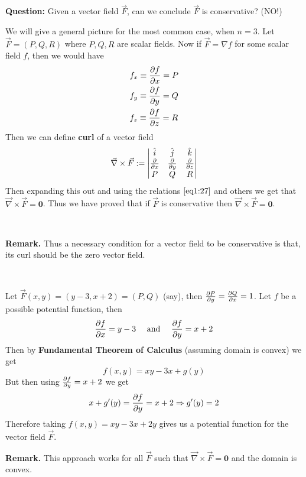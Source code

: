 \documentclass[../Analysis-3]{subfiles}
\begin{document}
\textbf{Question:} Given a vector field $\vec{F}$, can we conclude $\vec{F}$ is conservative? (NO!)

We will give a general picture for the most common case, when $n = 3$. Let $\vec{F} = (P,Q,R)$ where $P,Q,R$ are scalar fields. Now if $\vec{F} = \nabla f$ for some scalar field $f$, then we would have
\begin{align}\label{eq1:27}
     & f_x \equiv \pdv{f}{x} = P \\
     & f_y \equiv \pdv{f}{y} = Q \\
     & f_z \equiv \pdv{f}{z} = R
\end{align}
Then we can define \textbf{curl} of a vector field
\[
    \vec{\nabla} \times \vec{F} := \begin{vmatrix}
        \hat{i}   & \hat{j}   & \hat{k}   \\
        \pdv{}{x} & \pdv{}{y} & \pdv{}{z} \\
        P         & Q         & R
    \end{vmatrix}
\]
Then expanding this out and using the relations $\ref{eq1:27}$ and others we get that $\vec{\nabla} \times \vec{F} = \mathbf{0}$. Thus we have proved that if $\vec{F}$ is conservative then $\vec{\nabla} \times \vec{F} = \mathbf{0}$.

\

\textbf{Remark.} Thus a necessary condition for a vector field to be conservative is that, its curl should be the zero vector field.

\

\begin{Eg}{}{}
    Let $\vec{F}(x,y) = (y-3,x+2) = (P,Q)$ (say), then $\pdv{P}{y} = \pdv{Q}{x} = 1$. Let $f$ be a possible potential function, then
    \[
        \pdv{f}{x} = y-3 \quad \mbox{ and } \quad \pdv{f}{y} = x+2
    \]
    Then by \textbf{Fundamental Theorem of Calculus} (assuming domain is convex) we get
    \[
        f(x,y) = xy - 3x + g(y)
    \]
    But then using $\pdv{f}{y} = x+2$ we get
    \[
        x + g'(y) = \pdv{f}{y} = x+2 \Rightarrow g'(y) = 2
    \]
    Therefore taking $f(x,y) = xy - 3x + 2y$ gives us a potential function for the vector field $\vec{F}$.
\end{Eg}


\textbf{Remark.} This approach works for all $\vec{F}$ such that $\vec{\nabla} \times \vec{F} = \mathbf{0}$ and the domain is convex.
\end{document}
